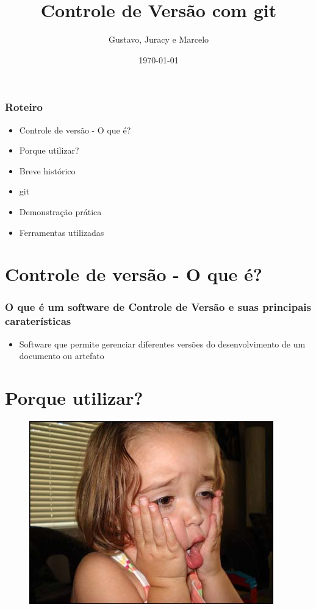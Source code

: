\documentclass{beamer}
\title[Gerência de Configuração e Testes]{Controle de Versão com git}
\author[Grupo Masters]{Gustavo, Juracy e Marcelo}
\institute{Centro Universitário Jorge Amado}
\date{\today}
\begin{document}
  \frame{\titlepage}
    \begin{frame}
    \frametitle{Roteiro}
   	\begin{itemize}
      \item Controle de versão - O que é?
      \item Porque utilizar?
      \item Breve histórico
      \item git
      \item Demonstração prática
      \item Ferramentas utilizadas
    \end{itemize}
  \end{frame}

  \section{Controle de versão - O que é?}
  \begin{frame}
    \frametitle{O que é um software de Controle de Versão e suas principais caraterísticas}
    \begin{itemize}
      \item Software que permite gerenciar diferentes versões do desenvolvimento de um documento ou artefato
    \end{itemize}
    \vfill
  \end{frame}

  \section{Porque utilizar?}
		\begin{frame}
    \begin{figure}[htb]
     \begin{center}
    	\includegraphics[scale=0.4]{panico.jpg}
     \end{center}
    \end{figure}
   \end{frame}
   
\end{document}
